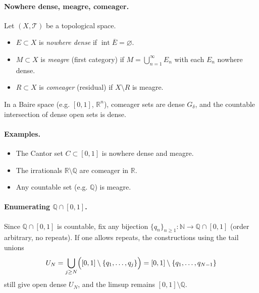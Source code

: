 \documentclass[11pt,a4paper]{article}
\theoremstyle{definition}
\theoremstyle{definition}
\theoremstyle{plain}
\theoremstyle{remark}
\begin{document}

\paragraph{Nowhere dense, meagre, comeager.}
Let $(X,\mathcal T)$ be a topological space.
\begin{itemize}
	\item $E\subset X$ is \emph{nowhere dense} if $\operatorname{int}\overline{E}=\varnothing$.
	\item $M\subset X$ is \emph{meagre} (first category) if $M=\bigcup_{n=1}^\infty E_n$ with each $E_n$ nowhere dense.
	\item $R\subset X$ is \emph{comeager} (residual) if $X\setminus R$ is meagre.
\end{itemize}
In a Baire space (e.g. $[0,1]$, $\mathbb R^n$), comeager sets are dense $G_\delta$,
and the countable intersection of dense open sets is dense.

\paragraph{Examples.}
\begin{itemize}
	\item The Cantor set $C\subset[0,1]$ is nowhere dense and meagre.
	\item The irrationals $\mathbb R\setminus\mathbb Q$ are comeager in $\mathbb R$.
	\item Any countable set (e.g. $\mathbb Q$) is meagre.
\end{itemize}

\paragraph{Enumerating $\mathbb Q\cap[0,1]$.}
Since $\mathbb Q\cap[0,1]$ is countable, fix any bijection
$\{q_n\}_{n\ge1}: \mathbb N\to \mathbb Q\cap[0,1]$ (order arbitrary, no repeats).
If one allows repeats, the constructions using the tail unions
\[
U_N=\bigcup_{j\ge N}\Bigl([0,1]\setminus\{q_1,\dots,q_j\}\Bigr)
=[0,1]\setminus\{q_1,\dots,q_{N-1}\}
\]
still give open dense $U_N$, and the limsup remains $[0,1]\setminus\mathbb Q$.

\end{document}

